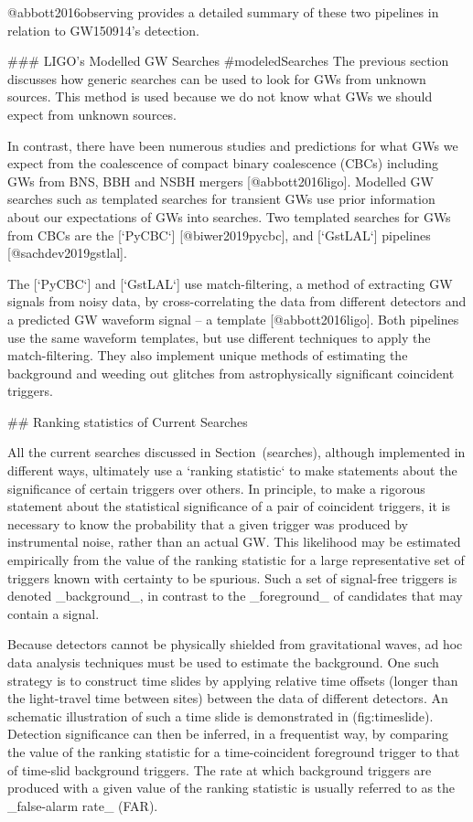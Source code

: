 {{{{{{{{{{{{{{{{{{@abbott2016observing provides a detailed summary of these two pipelines
in relation to GW150914's detection.

### LIGO's Modelled GW Searches {#modeledSearches}
The previous section discusses how generic searches can be used to
look for GWs from unknown sources. This method is used because  
we do not know what GWs we should expect from unknown sources.

In contrast, there have been numerous studies and predictions for what
GWs we expect from the coalescence of compact binary coalescence (CBCs)
including GWs from BNS, BBH and NSBH mergers [@abbott2016ligo]. Modelled
GW searches such as templated searches for transient GWs use prior
information about our expectations of GWs into searches. Two templated
searches for GWs from CBCs are the [`PyCBC`] [@biwer2019pycbc], and
[`GstLAL`] pipelines [@sachdev2019gstlal].

The [`PyCBC`] and [`GstLAL`] use match-filtering, a method of extracting
GW signals from noisy data, by cross-correlating the data from different
detectors and a predicted GW waveform signal --  a template
[@abbott2016ligo]. Both pipelines use the same waveform templates, but
use different techniques to apply the match-filtering. They also
implement unique methods of estimating the background and weeding out
glitches from astrophysically significant coincident triggers.




## Ranking statistics of Current Searches

All the current searches discussed in Section~\@ref(searches), although
implemented in different ways, ultimately use a `ranking statistic` to
make statements about the significance of certain triggers over others.
In principle, to make a rigorous statement about the statistical
significance of a pair of coincident triggers, it is necessary to know
the probability that a given trigger was produced by instrumental noise,
rather than an actual GW. This likelihood may be estimated empirically
from the value of the ranking statistic for a large representative set
of triggers known with certainty to be spurious. Such a set of
signal-free triggers is denoted _background_, in contrast to the
_foreground_ of candidates that may contain a signal.


Because detectors cannot be physically shielded from gravitational
waves, ad hoc data analysis techniques must be used to estimate the
background. One such strategy is to construct time slides by applying
relative time offsets (longer than the light-travel time between sites)
between the data of different detectors. An schematic illustration of
such a time slide is demonstrated in \@ref(fig:timeslide). Detection
significance can then be inferred, in a frequentist way, by comparing
the value of the ranking statistic for a time-coincident foreground
trigger to that of time-slid background triggers. The rate at which
background triggers are produced with a given value of the ranking
statistic is usually referred to as the _false-alarm rate_ (FAR).


}}}}}}}}}}}}}}}}}}
